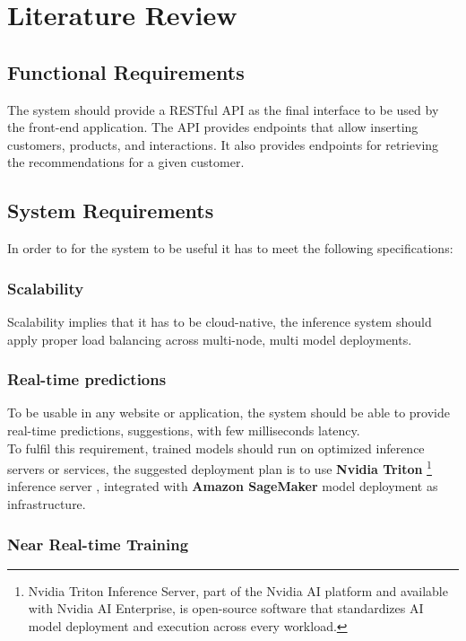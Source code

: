 \chapter{Literature Review}
\minitoc

\section{Functional Requirements}

The system should provide a RESTful API as the final interface to be used by the front-end application.
The API provides endpoints that allow inserting customers, products, and interactions. It also provides endpoints for retrieving the recommendations for a given customer.

\section{System Requirements}

In order to for the system to be useful it has to meet the following specifications:

\subsection{Scalability}
Scalability implies that it has to be cloud-native, the inference system should apply proper load balancing across multi-node, multi model deployments.

\subsection{Real-time predictions}
To be usable in any website or application, the system should be able to provide real-time predictions, suggestions, with few milliseconds latency. \\

To fulfil this requirement, trained models should run on optimized inference servers or services, the suggested deployment plan is to use
\textbf{Nvidia Triton}
\footnote{Nvidia Triton Inference Server, part of the Nvidia AI platform and available with Nvidia AI Enterprise, is open-source software that standardizes AI model deployment and execution across every workload.}
inference server \cite{Triton}, 
integrated with \textbf{Amazon SageMaker} model deployment\cite{SageMaker} as infrastructure.

\subsection{Near Real-time Training}

